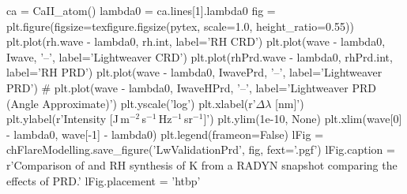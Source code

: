 \begin{pycode}[FlareModelling]
ca = CaII_atom()
lambda0 = ca.lines[1].lambda0
fig = plt.figure(figsize=texfigure.figsize(pytex, scale=1.0, height_ratio=0.55))
plt.plot(rh.wave - lambda0, rh.int, label='RH CRD')
plt.plot(wave - lambda0, Iwave, '--', label='Lightweaver CRD')
plt.plot(rhPrd.wave - lambda0, rhPrd.int, label='RH PRD')
plt.plot(wave - lambda0, IwavePrd, '--', label='Lightweaver PRD')
# plt.plot(wave - lambda0, IwaveHPrd, '--', label='Lightweaver PRD (Angle Approximate)')
plt.yscale('log')
plt.xlabel(r'$\Delta\lambda$ [nm]')
plt.ylabel(r'Intensity [J\,m$^{-2}$\,s$^{-1}$\,Hz$^{-1}$\,sr$^{-1}$]')
plt.ylim(1e-10, None)
plt.xlim(wave[0] - lambda0, wave[-1] - lambda0)
plt.legend(frameon=False)
lFig = chFlareModelling.save_figure('LwValidationPrd', fig, fext='.pgf')
lFig.caption = r'Comparison of \Lw{} and RH synthesis of \Caii{} K from a RADYN snapshot comparing the effects of PRD.'
lFig.placement = 'htbp'
\end{pycode}
